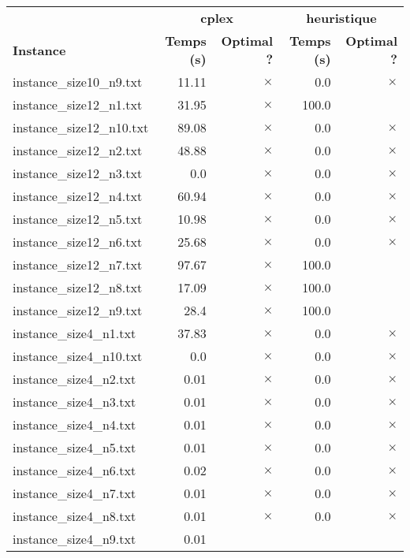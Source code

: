\documentclass{article}
\begin{document}
\newpage
\begin{center}
\renewcommand{\arraystretch}{1.4}
 \begin{tabular}{lrrrr}
	\hline
 & \multicolumn{2}{c}{\textbf{cplex}} & \multicolumn{2}{c}{\textbf{heuristique}}\\
\textbf{Instance}  & \textbf{Temps (s)} & \textbf{Optimal ?}  & \textbf{Temps (s)} & \textbf{Optimal ?} \\\hline

instance\_size10\_n9.txt & 11.11 & 
$\times$
 & 0.0 & 
$\times$
\\
instance\_size12\_n1.txt & 31.95 & 
$\times$
 & 100.0 & 
\\
instance\_size12\_n10.txt & 89.08 & 
$\times$
 & 0.0 & 
$\times$
\\
instance\_size12\_n2.txt & 48.88 & 
$\times$
 & 0.0 & 
$\times$
\\
instance\_size12\_n3.txt & 0.0 & 
$\times$
 & 0.0 & 
$\times$
\\
instance\_size12\_n4.txt & 60.94 & 
$\times$
 & 0.0 & 
$\times$
\\
instance\_size12\_n5.txt & 10.98 & 
$\times$
 & 0.0 & 
$\times$
\\
instance\_size12\_n6.txt & 25.68 & 
$\times$
 & 0.0 & 
$\times$
\\
instance\_size12\_n7.txt & 97.67 & 
$\times$
 & 100.0 & 
\\
instance\_size12\_n8.txt & 17.09 & 
$\times$
 & 100.0 & 
\\
instance\_size12\_n9.txt & 28.4 & 
$\times$
 & 100.0 & 
\\
instance\_size4\_n1.txt & 37.83 & 
$\times$
 & 0.0 & 
$\times$
\\
instance\_size4\_n10.txt & 0.0 & 
$\times$
 & 0.0 & 
$\times$
\\
instance\_size4\_n2.txt & 0.01 & 
$\times$
 & 0.0 & 
$\times$
\\
instance\_size4\_n3.txt & 0.01 & 
$\times$
 & 0.0 & 
$\times$
\\
instance\_size4\_n4.txt & 0.01 & 
$\times$
 & 0.0 & 
$\times$
\\
instance\_size4\_n5.txt & 0.01 & 
$\times$
 & 0.0 & 
$\times$
\\
instance\_size4\_n6.txt & 0.02 & 
$\times$
 & 0.0 & 
$\times$
\\
instance\_size4\_n7.txt & 0.01 & 
$\times$
 & 0.0 & 
$\times$
\\
instance\_size4\_n8.txt & 0.01 & 
$\times$
 & 0.0 & 
$\times$
\\
instance\_size4\_n9.txt & 0.01 & 

\end{tabular}
\end{center}
\end{document}
